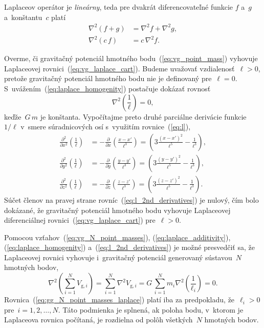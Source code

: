 \documentclass[a4paper, 12pt]{book}
\newcommand{\gidx}{\mathrm g}
\begin{document}
Laplaceov operátor je \emph{lineárny}, teda pre dvakrát diferencovateľné 
funkcie $f$ a~$g$ a~konštantu~$c$ platí
%
\begin{align}
\label{eq:laplace_additivity}
\nabla^2 \left(f + g \right) &= \nabla^2 f + \nabla^2 g{,}\\
%
\label{eq:laplace_homogenity}
\nabla^2 (c \, f) &= c \, \nabla^2 f{.}
\end{align}

Overme, či gravitačný potenciál hmotného bodu~(\ref{eq:vg_point_mass}) vyhovuje 
Laplaceovej rovnici~(\ref{eq:vg_laplace_cart}).  Budeme uvažovať 
vzdialenosť~$\ell > 0$, pretože gravitačný potenciál hmotného bodu nie je 
definovaný pre~$\ell = 0$.  S~uvážením~(\ref{eq:laplace_homogenity}) postačuje 
dokázať rovnosť
%
\begin{equation}
\label{eq:nabla_l}
\nabla^2 \left( \frac{1}{\ell} \right) = 0{,}
\end{equation}
%
keďže~$G \, m$ je konštanta.  Vypočítajme preto druhé parciálne
derivácie funkcie~$1 \slash \ell$ v~smere súradnicových osí s~využitím 
rovnice~(\ref{eq:l}),
%
\begin{equation}
\label{eq:l_2nd_derivatives}
\begin{split}
\frac{\partial^2}{\partial x^2} \left( \frac{1}{\ell} \right) &=
-\frac{\partial}{\partial x} \left( \frac{x - x'}{\ell^3} \right) = \left(3
\frac{(x - x')^2}{\ell^5} - \frac{1}{\ell^3} \right){,}\\
%
\frac{\partial^2}{\partial y^2} \left( \frac{1}{\ell} \right) &=
-\frac{\partial}{\partial y} \left( \frac{y - y'}{\ell^3} \right) = \left(3
\frac{(y - y')^2}{\ell^5} - \frac{1}{\ell^3} \right){,}\\
%
\frac{\partial^2}{\partial z^2} \left( \frac{1}{\ell} \right) &=
-\frac{\partial}{\partial z} \left( \frac{z - z'}{\ell^3} \right) = \left(3
\frac{(z - z')^2}{\ell^5} - \frac{1}{\ell^3} \right){.}
\end{split}
\end{equation}
%
Súčet členov na pravej strane rovníc~(\ref{eq:l_2nd_derivatives}) je nulový, 
čím bolo dokázané, že gravitačný potenciál hmotného bodu vyhovuje Laplaceovej 
diferenciálnej rovnici~(\ref{eq:vg_laplace_cart}) pre~$\ell > 0$.

Pomocou vzťahov~(\ref{eq:vg_N_point_masses}), (\ref{eq:laplace_additivity}), 
(\ref{eq:laplace_homogenity}) a~(\ref{eq:l_2nd_derivatives}) je možné 
presvedčiť sa, že Laplaceovej rovnici vyhovuje i~gravitačný potenciál 
generovaný sústavou~$N$ hmotných bodov,
%
\begin{equation}
\label{eq:gg_N_point_masses_laplace}
\nabla^2 \left( \sum_{i = 1}^N V_{\gidx,i} \right) = \sum_{i = 1}^N \nabla^2
V_{\gidx,i} = G \, \sum_{i = 1}^N m_i \nabla^2 \left( \frac{1}{\ell_i} \right) 
= 0{.}
\end{equation}
%
Rovnica~(\ref{eq:gg_N_point_masses_laplace}) platí iba za predpokladu, 
že~$\ell_i > 0$ pre~$i = 1, 2, \dots, N$.  Táto podmienka je splnená, ak poloha 
bodu, v~ktorom je Laplaceova rovnica počítaná, je rozdielna od polôh 
všetkých~$N$ hmotných bodov.
\end{document}
